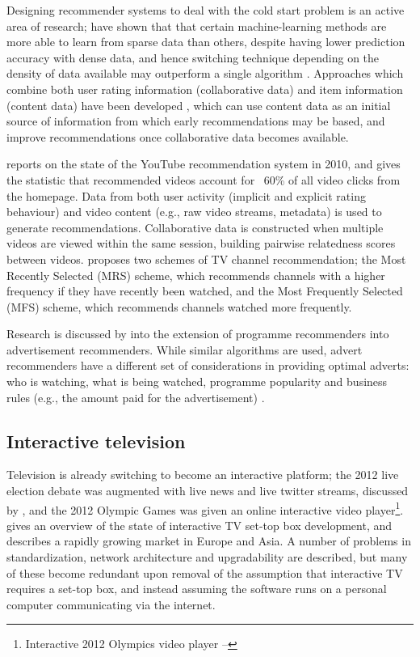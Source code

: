 	Designing recommender systems to deal with the cold start problem is an active area of research; \citet{cold-start-problem} have shown that that certain machine-learning methods are more able to learn from sparse data than others, despite having lower prediction accuracy with dense data, and hence switching technique depending on the density of data available may outperform a single algorithm . Approaches which combine both user rating information (collaborative data) and item information (content data) have been developed \citep{generative_models}, which can use content data as an initial source of information from which early recommendations may be based, and improve recommendations once collaborative data becomes available.

	\citet{davidson2012} reports on the state of the YouTube recommendation system in 2010, and gives the statistic that recommended videos account for ~60\% of all video clicks from the homepage. Data from both user activity (implicit and explicit rating behaviour) and video content (e.g., raw video streams, metadata) is used to generate recommendations. Collaborative data is constructed when multiple videos are viewed within the same session, building pairwise relatedness scores between videos. \citep{personalisedEPG} proposes two schemes of TV channel recommendation; the Most Recently Selected (MRS) scheme, which recommends channels with a higher frequency if they have recently been watched, and the Most Frequently Selected (MFS) scheme, which recommends channels watched more frequently.

	Research is discussed by \citet{contextual_advertising} into the extension of programme recommenders into advertisement recommenders. While similar algorithms are used, advert recommenders have a different set of considerations in providing optimal adverts: who is watching, what is being watched, programme popularity and business rules (e.g., the amount paid for the advertisement) \citep{contextual_advertising}. 

\subsection{Interactive television}

	Television is already switching to become an interactive platform; the 2012 live election debate was augmented with live news and live twitter streams, discussed by \citet{2010_election}, and the 2012 Olympic Games was given an online interactive video player\footnote{Interactive 2012 Olympics video player -- }. \citet{tv_stb_overview} gives an overview of the state of interactive TV set-top box development, and describes a rapidly growing market in Europe and Asia. A number of problems in standardization, network architecture and upgradability are described, but many of these become redundant upon removal of the assumption that interactive TV requires a set-top box, and instead assuming the software runs on a personal computer communicating via the internet.

